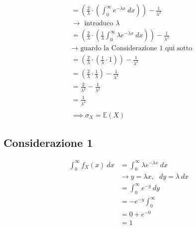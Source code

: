 \documentclass[11pt]{report}
\begin{document}
\begin{itemize}
\begin{equation}
\begin{split}
            & = \left( \frac{2}{\lambda} \cdot \left( \int_0^\infty e^{-\lambda x}\ dx \right) \right) - \frac{1}{\lambda^2}\\
            & \rightarrow \text{ introduco } \lambda\\
            & = \left( \frac{2}{\lambda} \cdot \left( \frac{1}{\lambda} \int_0^\infty \lambda e^{-\lambda x}\ dx \right) \right) - \frac{1}{\lambda^2}\\
            & \rightarrow \text{ guardo la Considerazione 1 qui sotto}\\
            & = \left( \frac{2}{\lambda} \cdot \left( \frac{1}{\lambda} \cdot 1 \right) \right) - \frac{1}{\lambda^2}\\
            & = \left( \frac{2}{\lambda} \cdot \frac{1}{\lambda} \right) - \frac{1}{\lambda^2}\\
            & = \frac{2}{\lambda^2} - \frac{1}{\lambda^2}\\
            & = \frac{1}{\lambda^2}\\
            \\
            & \implies \sigma_X = \mathbb{E}(X)
		\end{split}
    \end{equation}
\end{itemize}
\begin{center}
    
\end{center}
\begin{center}
    
\end{center}
\subsection{Considerazione 1}
\begin{equation}
    \begin{split}
        \int_0^\infty f_X(x)\ dx & = \int_0^\infty \lambda e^{-\lambda x}\ dx\\
        & \rightarrow y = \lambda x,\ \ \ dy = \lambda\ dx\\
        & = \int_0^\infty e^{-y}\ dy\\
        & = - e^{-y} \int_0^\infty\\
        & = 0 + e^{-0}\\
        & = 1
    \end{split}
\end{equation}
\end{document}
